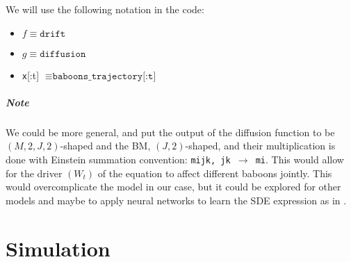 \documentclass[
    article,
    oneside,
]{memoir}
\begin{document}
We will use the following notation in the code:
\begin{itemize}
    \item $f \equiv \texttt{drift}$
    \item $g \equiv \texttt{diffusion}$
    \item \texttt{x}[:t] $\equiv \texttt{baboons\_trajectory[:t]}$
\end{itemize}

\paragraph{Note} We could be more general, and put the output of the diffusion function to be
$(M, 2, J, 2)$-shaped and the BM, $(J, 2)$-shaped, and their multiplication is done
with Einstein summation convention: \texttt{mijk, jk $\rightarrow$ mi}. This would allow for the driver \((W_t)\) of the equation to affect different baboons jointly. This would overcomplicate the model in our case, but it could be explored for other models and maybe to apply neural networks to learn the SDE expression as in \cite{chen2019neuralordinarydifferentialequations, kidger2021neuralsdesinfinitedimensionalgans}.

\chapter{Simulation}
\end{document}
